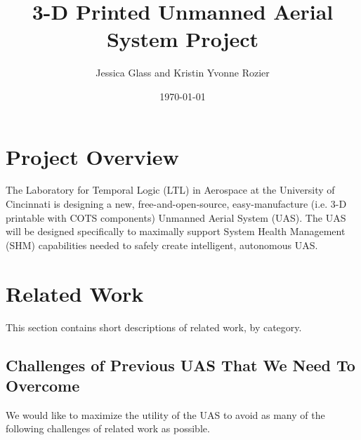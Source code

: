 \documentclass{article}
\title{3-D Printed Unmanned Aerial System Project}
\author{
Jessica Glass %
and Kristin Yvonne Rozier %
}
\affil{University of Cincinnati, Cincinnati, Ohio, USA \\
   \texttt{\{glassjp,rozierky\}@ucmail.uc.edu}
}
\date{\today}
\begin{document}
\maketitle

%
%
\tableofcontents


\section{Project Overview}
The Laboratory for Temporal Logic (LTL) in Aerospace at the University of Cincinnati is designing a new, free-and-open-source, easy-manufacture (i.e. 3-D printable with COTS components) Unmanned Aerial System (UAS). The UAS will be designed specifically to maximally support System Health Management (SHM) capabilities needed to safely create intelligent, autonomous UAS.


\section{Related Work}

This section contains short descriptions of related work, by category.

\subsection{Challenges of Previous UAS That We Need To Overcome}

We would like to maximize the utility of the UAS to avoid as many of the following challenges of related work as possible.
\end{document}
